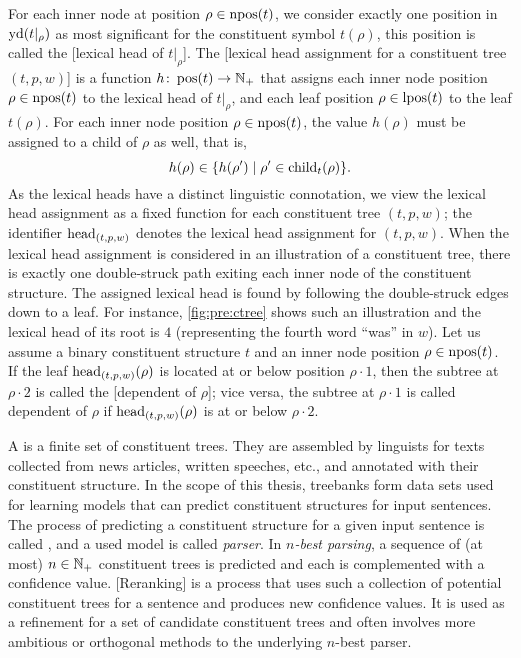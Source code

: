 \documentclass[../document.tex]{subfiles}
\begin{document}
    For each inner node at position \(\rho \in \operatorname{npos}(t)\), we consider exactly one position in \(\operatorname{yd}(t|_\rho)\) as most significant for the constituent symbol \(t(\rho)\), this position is called the [lexical head of \(t|_\rho\)].
    The [lexical head assignment for a constituent tree $(t,p,w)$] is a function \(h\colon \operatorname{pos}(t) \to \mathbb{N}_+\) that assigns each inner node position \(\rho \in \operatorname{npos}(t)\) to the lexical head of \(t|_\rho\), and each leaf position \(\rho \in \operatorname{lpos}(t)\) to the leaf \(t(\rho)\).
    For each inner node position \(\rho \in \operatorname{npos}(t)\), the value \(h(\rho)\) must be assigned to a child of \(\rho\) as well, that is, \[
        h(\rho) \in \{ h(\rho') \mid \rho' \in \operatorname{child}_t(\rho) \} \text{.}
    \]
    As the lexical heads have a distinct linguistic connotation, we view the lexical head assignment as a fixed function for each constituent tree \((t,p,w)\); the identifier \(\operatorname{head}_{(t,p,w)}\) denotes the lexical head assignment for \((t,p,w)\).
    When the lexical head assignment is considered in an illustration of a constituent tree, there is exactly one double-struck path exiting each inner node of the constituent structure.
    The assigned lexical head is found by following the double-struck edges down to a leaf.
    For instance, \cref{fig:pre:ctree} shows such an illustration and the lexical head of its root is \(4\) (representing the fourth word ``was'' in $w$).
    Let us assume a binary constituent structure \(t\) and an inner node position \(\rho \in \operatorname{npos}(t)\).
    If the leaf \(\operatorname{head}_{(t,p,w)}(\rho)\) is located at or below position \(\rho \cdot 1\), then the subtree at \(\rho \cdot 2\) is called the [dependent of $\rho$]; vice versa, the subtree at \(\rho \cdot 1\) is called dependent of $\rho$ if \(\operatorname{head}_{(t,p,w)}(\rho)\) is at or below \(\rho \cdot 2\).

    A  is a finite set of constituent trees.
    They are assembled by linguists for texts collected from news articles, written speeches, etc., and annotated with their constituent structure.
    In the scope of this thesis, treebanks form data sets used for learning models that can predict constituent structures for input sentences.
    The process of predicting a constituent structure for a given input sentence is called , and a used model is called \emph{parser}.
    In \emph{\(n\)-best parsing}, a sequence of (at most) \(n \in \mathbb{N}_+\) constituent trees is predicted and each is complemented with a confidence value.
    [Reranking] is a process that uses such a collection of potential constituent trees for a sentence and produces new confidence values.
    It is used as a refinement for a set of candidate constituent trees and often involves more ambitious or orthogonal methods to the underlying \(n\)-best parser.
\end{document}
